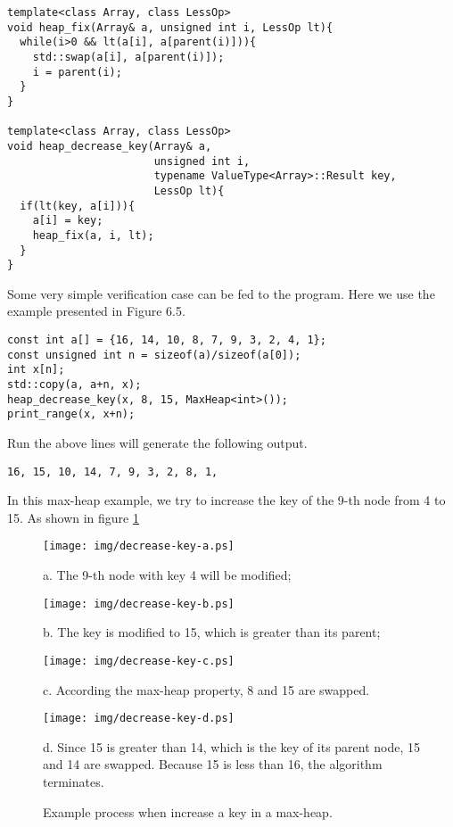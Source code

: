\documentclass{article}
\begin{document}
\lstset{language=C++}
\begin{lstlisting}
template<class Array, class LessOp>
void heap_fix(Array& a, unsigned int i, LessOp lt){
  while(i>0 && lt(a[i], a[parent(i)])){
    std::swap(a[i], a[parent(i)]);
    i = parent(i);
  }
}

template<class Array, class LessOp>
void heap_decrease_key(Array& a, 
                       unsigned int i, 
                       typename ValueType<Array>::Result key,
                       LessOp lt){
  if(lt(key, a[i])){
    a[i] = key;
    heap_fix(a, i, lt);
  }
}
\end{lstlisting}

Some very simple verification case can be fed to the program.
Here we use the example presented in \cite{CLRS} Figure 6.5.

\begin{lstlisting}
const int a[] = {16, 14, 10, 8, 7, 9, 3, 2, 4, 1};
const unsigned int n = sizeof(a)/sizeof(a[0]);
int x[n];
std::copy(a, a+n, x);
heap_decrease_key(x, 8, 15, MaxHeap<int>());
print_range(x, x+n);
\end{lstlisting}

Run the above lines will generate the following output.
\begin{verbatim}
16, 15, 10, 14, 7, 9, 3, 2, 8, 1,
\end{verbatim}

In this max-heap example, we try to increase the key of the 9-th node from 
4 to 15. As shown in figure \ref{fig:decrease-key}

\begin{figure}[htbp]
  \begin{center}
    \texttt{[image: img/decrease-key-a.ps]}

    a. The 9-th node with key 4 will be modified;

    \texttt{[image: img/decrease-key-b.ps]}

    b. The key is modified to 15, which is greater than its parent;

    \texttt{[image: img/decrease-key-c.ps]}

    c. According the max-heap property, 8 and 15 are swapped.

    \texttt{[image: img/decrease-key-d.ps]}

    d. Since 15 is greater than 14, which is the key of its parent node, 15 and 14 are swapped. Because 15 is less than 16, the algorithm terminates.
    
    \caption{Example process when increase a key in a max-heap.} \label{fig:decrease-key}
  \end{center}
\end{figure}
\end{document}

